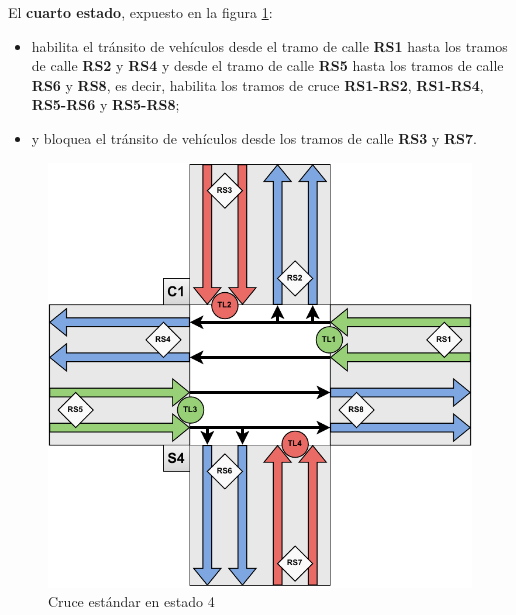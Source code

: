 \newpage
El \textbf{cuarto estado}, expuesto en la figura \ref{fig:cruce_estandar_estado_4}:
\begin{itemize}
    \item habilita el tránsito de vehículos desde el tramo de calle \textbf{RS1} hasta los tramos de calle \textbf{RS2} y \textbf{RS4} y desde el tramo de calle \textbf{RS5} hasta los tramos de calle \textbf{RS6} y \textbf{RS8}, es decir, habilita los tramos de cruce \textbf{RS1-RS2}, \textbf{RS1-RS4}, \textbf{RS5-RS6} y \textbf{RS5-RS8};
    \item y bloquea el tránsito de vehículos desde los tramos de calle \textbf{RS3} y \textbf{RS7}.
\end{itemize}
\begin{figure}[H]
    \centering
    \includegraphics[width=1\linewidth]{text/image/DCruc-CE-Estado4.pdf}
    \caption{Cruce estándar en estado 4}
    \label{fig:cruce_estandar_estado_4}
\end{figure}

